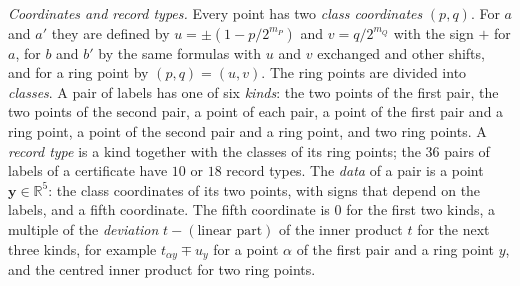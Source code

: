 \documentclass[reqno,a4paper,11pt]{amsart}
\numberwithin{equation}{section}
\def\R{{\mathbb R}}
\begin{document}
\emph{Coordinates and record types.} Every point has two \emph{class coordinates} $(p, q)$. For $a$ and $a'$ they are defined by $u = \pm (1 - p / 2^{m_P})$ and $v = q / 2^{m_Q}$ with the sign $+$ for $a$, for $b$ and $b'$ by the same formulas with $u$ and $v$ exchanged and other shifts, and for a ring point by $(p, q) = (u, v)$. The ring points are divided into \emph{classes}. A pair of labels has one of six \emph{kinds}: the two points of the first pair, the two points of the second pair, a point of each pair, a point of the first pair and a ring point, a point of the second pair and a ring point, and two ring points. A \emph{record type} is a kind together with the classes of its ring points; the $36$ pairs of labels of a certificate have $10$ or $18$ record types. The \emph{data} of a pair is a point $\mathbf{y} \in \R^5$: the class coordinates of its two points, with signs that depend on the labels, and a fifth coordinate. The fifth coordinate is $0$ for the first two kinds, a multiple of the \emph{deviation} $t - (\text{linear part})$ of the inner product $t$ for the next three kinds, for example $t_{\alpha y} \mp u_y$ for a point $\alpha$ of the first pair and a ring point $y$, and the centred inner product for two ring points.
\end{document}
